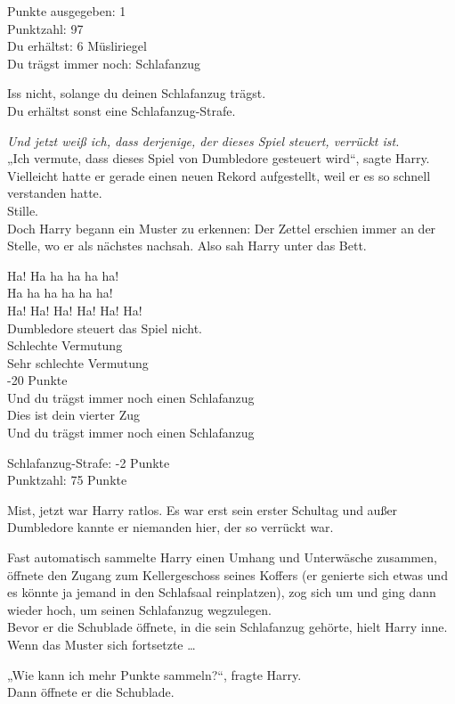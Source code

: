 {Punkte ausgegeben: 1\\ Punktzahl: 97\\ Du erhältst: 6 Müsliriegel\\ Du trägst immer noch: Schlafanzug

Iss nicht, solange du deinen Schlafanzug trägst.\\ Du erhältst sonst eine Schlafanzug-Strafe.

\emph{Und jetzt weiß ich, dass derjenige, der dieses Spiel steuert, verrückt ist.}\\ „Ich vermute, dass dieses Spiel von Dumbledore gesteuert wird“, sagte Harry. Vielleicht hatte er gerade einen neuen Rekord aufgestellt, weil er es so schnell verstanden hatte.\\ Stille.\\ Doch Harry begann ein Muster zu erkennen: Der Zettel erschien immer an der Stelle, wo er als nächstes nachsah. Also sah Harry unter das Bett.

Ha! Ha ha ha ha ha!\\ Ha ha ha ha ha ha!\\ Ha! Ha! Ha! Ha! Ha! Ha!\\ Dumbledore steuert das Spiel nicht.\\ Schlechte Vermutung\\ Sehr schlechte Vermutung\\ -20 Punkte\\ Und du trägst immer noch einen Schlafanzug\\ Dies ist dein vierter Zug\\ Und du trägst immer noch einen Schlafanzug

Schlafanzug-Strafe: -2 Punkte\\ Punktzahl: 75 Punkte

Mist, jetzt war Harry ratlos. Es war erst sein erster Schultag und außer Dumbledore kannte er niemanden hier, der so verrückt war.

Fast automatisch sammelte Harry einen Umhang und Unterwäsche zusammen, öffnete den Zugang zum Kellergeschoss seines Koffers (er genierte sich etwas und es könnte ja jemand in den Schlafsaal reinplatzen), zog sich um und ging dann wieder hoch, um seinen Schlafanzug wegzulegen.\\ Bevor er die Schublade öffnete, in die sein Schlafanzug gehörte, hielt Harry inne. Wenn das Muster sich fortsetzte …

„Wie kann ich mehr Punkte sammeln?“, fragte Harry.\\ Dann öffnete er die Schublade.

}
